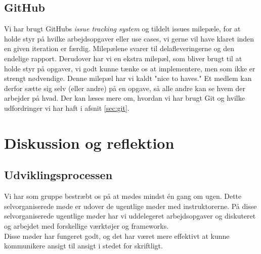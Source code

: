 \documentclass[12pt]{article}
\begin{document}
\subsection{GitHub}
Vi har brugt GitHubs \textit{issue tracking system}\cite{issuetracking} og tildelt issues milepæle, for at holde styr på hvilke arbejdsopgaver eller use cases, vi gerne vil have klaret inden en given iteration er færdig. Milepælene svarer til delafleveringerne og den endelige rapport. Derudover har vi en ekstra milepæl, som bliver brugt til at holde styr på opgaver, vi godt kunne tænke os at implementere, men som ikke er strengt nødvendige. Denne milepæl har vi kaldt "nice to haves."{} Et medlem kan derfor sætte sig selv (eller andre) på en opgave, så alle andre kan se hvem der arbejder på hvad. Der kan læses mere om, hvordan vi har brugt Git og hvilke udfordringer vi har haft i afsnit \ref{sec:git}.

\section{Diskussion og reflektion} %
\label{sec:diskussion}

\subsection{Udviklingsprocessen}
Vi har som gruppe bestræbt os på at mødes mindst én gang om ugen. Dette selvorganiserede møde er udover de ugentlige møder med instruktorerne. På disse selvorganiserede ugentlige møder har vi uddelegeret arbejdsopgaver og diskuteret og arbejdet med forskellige værktøjer og frameworks.\\
Disse møder har fungeret godt, og det har været mere effektivt at kunne kommunikere ansigt til ansigt i stedet for skriftligt.
\end{document}

